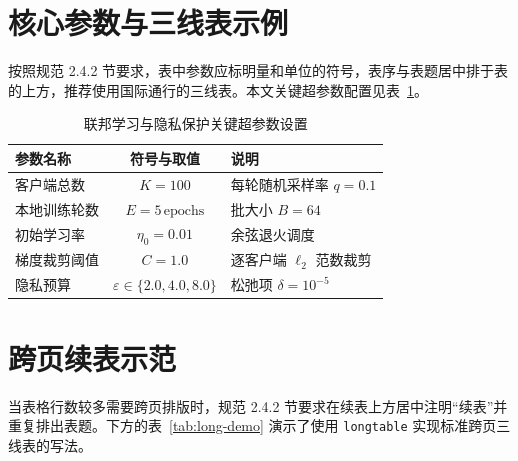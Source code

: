 \section{核心参数与三线表示例}

按照规范 2.4.2 节要求，表中参数应标明量和单位的符号，表序与表题居中排于表的上方，推荐使用国际通行的三线表。本文关键超参数配置见表~\ref{tab:hyperparams}。

\begin{table}[htbp]
  \centering
  \caption{联邦学习与隐私保护关键超参数设置}
  \label{tab:hyperparams}
  \begin{tabular}{@{}l c l@{}}
    \toprule
    参数名称 & 符号与取值 & 说明 \\
    \midrule
    客户端总数 & $K = 100$ & 每轮随机采样率 $q = 0.1$ \\
    本地训练轮数 & $E = 5\,\mathrm{epochs}$ & 批大小 $B = 64$ \\
    初始学习率 & $\eta_0 = 0.01$ & 余弦退火调度 \\
    梯度裁剪阈值 & $C = 1.0$ & 逐客户端 $\ell_2$ 范数裁剪 \\
    隐私预算 & $\varepsilon \in \{2.0, 4.0, 8.0\}$ & 松弛项 $\delta = 10^{-5}$ \\
    \bottomrule
  \end{tabular}
\end{table}

\section{跨页续表示范}

当表格行数较多需要跨页排版时，规范 2.4.2 节要求在续表上方居中注明“续表”并重复排出表题。下方的表~\ref{tab:long-demo} 演示了使用 \texttt{longtable} 实现标准跨页三线表的写法。

